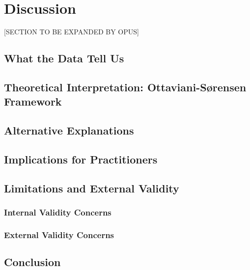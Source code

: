 \section{Discussion}
\label{sec:discussion}

[SECTION TO BE EXPANDED BY OPUS]


\subsection{What the Data Tell Us}
\label{subsec:evidence}


\subsection{Theoretical Interpretation: Ottaviani-Sørensen Framework}
\label{subsec:osinterpret}


\subsection{Alternative Explanations}
\label{subsec:alternatives}


\subsection{Implications for Practitioners}
\label{subsec:implications}


\subsection{Limitations and External Validity}
\label{subsec:limitations}

\subsubsection{Internal Validity Concerns}

\subsubsection{External Validity Concerns}

\subsection{Conclusion}
\label{subsec:conclusion}
